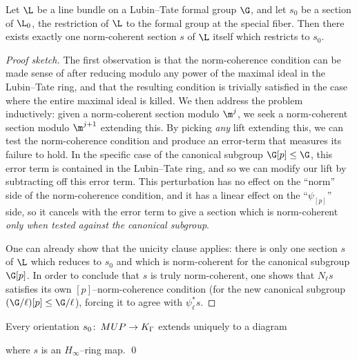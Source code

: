 \begin{theorem}\label{AndosAlgebraicTheorem}
Let \(\L\) be a line bundle on a Lubin--Tate formal group \(\G\), and let \(s_0\) be a section of \(\L_0\), the restriction of \(\L\) to the formal group at the special fiber.  Then there exists exactly one norm-coherent section \(s\) of \(\L\) itself which restricts to \(s_0\).
\end{theorem}
\begin{proof}[Proof sketch]
The first observation is that the norm-coherence condition can be made sense of after reducing modulo any power of the maximal ideal in the Lubin--Tate ring, and that the resulting condition is trivially satisfied in the case where the entire maximal ideal is killed.  We then address the problem inductively: given a norm-coherent section modulo \(\m^j\), we seek a norm-coherent section modulo \(\m^{j+1}\) extending this.  By picking \emph{any} lift extending this, we can test the norm-coherence condition and produce an error-term that measures its failure to hold.  In the specific case of the canonical subgroup \(\G[p] \le \G\), this error term is contained in the Lubin--Tate ring, and so we can modify our lift by subtracting off this error term.  This perturbation has no effect on the ``norm'' side of the norm-coherence condition, and it has a linear effect on the ``\(\psi_{[p]}\)'' side, so it cancels with the error term to give a section which is norm-coherent \emph{only when tested against the canonical subgroup}.

One can already show that the unicity clause applies: there is only one section \(s\) of \(\L\) which reduces to \(s_0\) and which is norm-coherent for the canonical subgroup \(\G[p]\).  In order to conclude that \(s\) is truly norm-coherent, one shows that \(N_\ell s\) satisfies its own \([p]\)--norm-coherence condition (for the new canonical subgroup \((\G / \ell)[p] \le \G / \ell\)), forcing it to agree with \(\psi_\ell^* s\).
\end{proof}

\begin{corollary}\label{AHSHinftyResultForEthy}
Every orientation \(s_0\colon\thinspace MUP \to K_\Gamma\) extends uniquely to a diagram
\begin{center}
\end{center}
where \(s\) is an \(H_\infty\)--ring map. \qed
\end{corollary}

